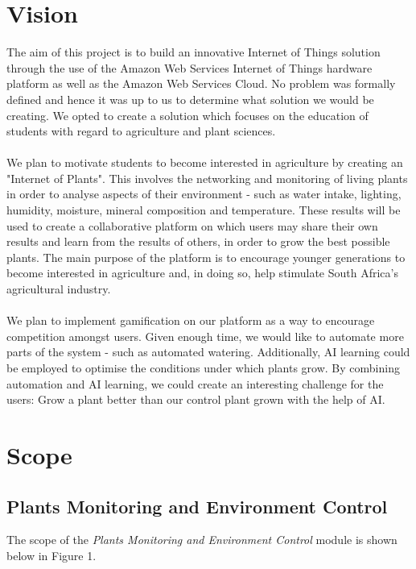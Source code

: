 \documentclass{article}
\begin{document}
\section{Vision}
The aim of this project is to build an innovative Internet of Things solution through the use of the Amazon Web Services Internet of Things hardware platform as well as the Amazon Web Services Cloud. No problem was formally defined and hence it was up to us to determine what solution we would be creating. We opted to create a solution which focuses on the education of students with regard to agriculture and plant sciences.\\\\
We plan to motivate students to become interested in agriculture by creating an "Internet of Plants". This involves the networking and monitoring of living plants in order to analyse aspects of their environment - such as water intake, lighting, humidity, moisture, mineral composition and temperature. These results will be used to create a collaborative platform on which users may share their own results and learn from the results of others, in order to grow the best possible plants. The main purpose of the platform is to encourage younger generations to become interested in agriculture and, in doing so, help stimulate South Africa's agricultural industry.\\\\
We plan to implement gamification on our platform as a way to encourage competition amongst users. Given enough time, we would like to automate more parts of the system - such as automated watering. Additionally, AI learning could be employed to optimise the conditions under which plants grow. By combining automation and AI learning, we could create an interesting challenge for the
users: Grow a plant better than our control plant grown with the help of AI.
\cleardoublepage

\section{Scope}
	\subsection{Plants Monitoring and Environment Control}
		The scope of the \emph{Plants Monitoring and Environment Control} module is shown below in Figure 1.
		
\end{document}
